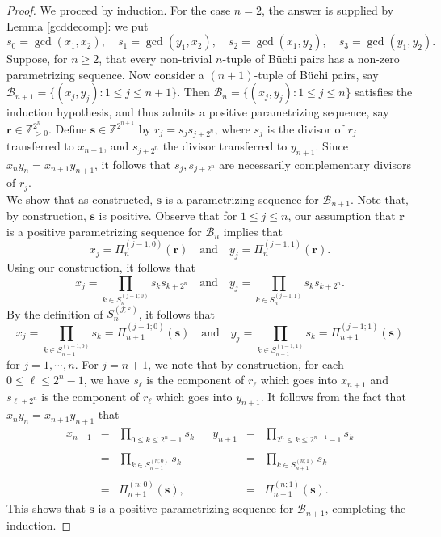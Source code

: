 \documentclass[letterpaper,10pt]{amsart}
\newcommand{\bZ}{{\mathbb{Z}}}
\newcommand{\Br}{{\mathbf{r}}}
\newcommand{\Bs}{{\mathbf{s}}}
\newcommand{\B}{{\mathcal{B}}}
\newcommand{\ep}{\varepsilon}
\theoremstyle{definition}
\numberwithin{equation}{section}
\begin{document}
\begin{proof}  We proceed by induction. For the case $n = 2$, the answer is supplied by Lemma \ref{gcddecomp}: we put 
\[s_0 = \gcd(x_1, x_2), \quad s_1 = \gcd(y_1, x_2), \quad s_2 = \gcd(x_1, y_2), \quad s_3 = \gcd(y_1, y_2).\]
Suppose, for $n \geq 2$, that every non-trivial $n$-tuple of B\"{u}chi pairs has a non-zero parametrizing sequence. Now consider a $(n+1)$-tuple of B\"{u}chi pairs, say $\B_{n+1} = \{(x_j, y_j) : 1 \leq j \leq n+1\}$. Then $\B_n = \{(x_j, y_j) : 1 \leq j \leq n\}$ satisfies the induction hypothesis, and thus admits a positive parametrizing sequence, say $\Br \in \bZ_{>0}^{2^n}$. Define $\Bs \in \bZ^{2^{n+1}}$ by $r_j = s_j s_{j+2^n}$, where $s_j$ is the divisor of $r_j$ transferred to $x_{n+1}$, and $s_{j+2^n}$ the divisor transferred to $y_{n+1}$. Since $x_n y_n = x_{n+1} y_{n+1}$, it follows that $s_j, s_{j+2^n}$ are necessarily complementary divisors of $r_j$. \\

We show that as constructed, $\Bs$ is a parametrizing sequence for $\B_{n+1}$. Note that, by construction, $\Bs$ is positive. Observe that for $1 \leq j \leq n$, our assumption that $\Br$ is a positive parametrizing sequence for $\B_n$ implies that 
\[x_j = \Pi_n^{(j-1;0)} (\Br) \quad \text{and} \quad y_j = \Pi_n^{(j-1;1)} (\Br).\]
Using our construction, it follows that 
\[ x_j = \prod_{k \in S_n^{(j-1;0)}} s_k s_{k + 2^n} \quad \text{and} \quad y_j = \prod_{k \in S_n^{(j-1;1)}} s_k s_{k+2^n}.\]
By the definition of $S_n^{(j;\ep)}$, it follows that 
\begin{equation} x_j = \prod_{k \in S_{n+1}^{(j-1;0)}} s_k = \Pi_{n+1}^{(j-1;0)} (\Bs) \quad \text{and} \quad y_j = \prod_{k \in S_{n+1}^{(j-1;1)}} s_k = \Pi_{n+1}^{(j-1;1)}(\Bs)
\end{equation}
for $j = 1, \cdots, n$. For $j = n + 1$, we note that by construction, for each $0 \leq \ell \leq 2^n - 1$, we have $s_\ell$ is the component of $r_\ell$ which goes into $x_{n+1}$ and $s_{\ell + 2^n}$ is the component of $r_\ell$ which goes into $y_{n+1}$. It follows from the fact that $x_n y_n = x_{n+1} y_{n+1}$ that 
\begin{equation}
\begin{matrix}
 x_{n+1} & = & \prod_{0 \leq k \leq 2^n - 1} s_k & & y_{n+1} & = & \prod_{2^n \leq k \leq 2^{n+1} - 1} s_{k}  \\ \\
& = & \prod_{k \in S_{n+1}^{(n;0)}} s_k    & & & = & \prod_{k \in S_{n+1}^{(n;1)}} s_k  \\ \\
& = &  \Pi_{n+1}^{(n; 0)} (\Bs), & & & = & \Pi_{n+1}^{(n;1)} (\Bs). \end{matrix}
\end{equation}
This shows that $\Bs$ is a positive parametrizing sequence for $\B_{n+1}$, completing the induction. \end{proof}
\end{document}
